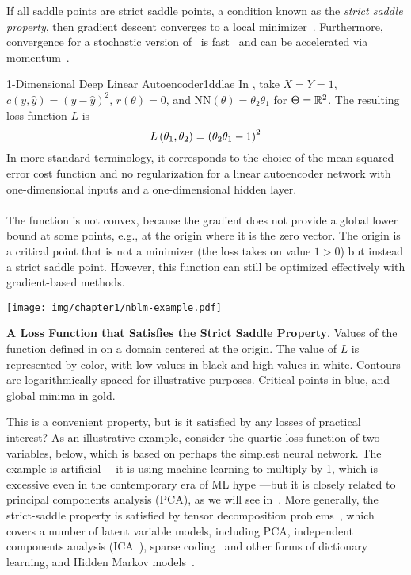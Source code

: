 \documentclass[../../thesis.tex]{subfiles}
\begin{document}
If all saddle points are strict saddle points,
a condition known as the \emph{strict saddle property},
then gradient descent converges to a local minimizer~\cite{lee2016,lee2019}.
Furthermore, convergence for a stochastic
version of~ is fast~\cite{jin2018a}
and can be accelerated via momentum~\cite{jin2018b}.

\begin{example}[float=hp]{1-Dimensional Deep Linear Autoencoder}{1ddlae}
	In , take $X = Y = 1$,
	$c(y, \hat{y}) = {\left(y - \hat{y}\right)}^2$,
	$r(\theta) = 0$,
	and
	$\mathrm{NN}(\theta) = \theta_2\theta_1$
	for $\Theta = \mathbb{R}^2$.
	The resulting loss function $L$ is
	\begin{equation}\equationlabel{nblm-example}
		L\left(\theta_1, \theta_2\right) = {\left(\theta_2\theta_1 - 1\right)}^2
	\end{equation}
	In more standard terminology,
	it corresponds to the choice of
	the mean squared error cost function
	and no regularization
	for a linear autoencoder network
	with one-dimensional inputs
	and a one-dimensional hidden layer.
	\\ \ \\
	The function is not convex,
	because the gradient
	does not provide a global lower bound
	at some points, e.g., at the origin
	where it is the zero vector.
	The origin is a critical point
	that is not a minimizer
	(the loss takes on value $1 > 0$)
	but instead a strict saddle point.
	However, this function can still be optimized effectively with
	gradient-based methods.

	\begin{center}
		\texttt{[image: img/chapter1/nblm-example.pdf]}
	\end{center}
	{\textbf{A Loss Function that Satisfies the Strict Saddle Property}.}%
	{Values of the function defined in 
	 on a domain centered at the origin.
	 The value of $L$ is represented by color,
	 with low values in black and high values in white.
	 Contours are logarithmically-spaced for illustrative purposes.
	 Critical points in blue, and global minima in gold.}
\end{example}

This is a convenient property, but is it satisfied
by any losses of practical interest?
As an illustrative example, consider the quartic loss function
of two variables,  below,
which is based on perhaps the simplest neural network.
The example is artificial---
it is using machine learning to multiply by 1,
which is excessive even in the contemporary era of ML hype
---but it is closely related to principal components analysis (PCA),
as we will see in~.
More generally, the strict-saddle property is
satisfied by tensor decomposition problems~\cite{ge2015},
which covers a number of latent variable models, including
PCA,
independent components analysis (ICA~\cite{bell1997,comon2009}),
sparse coding~\cite{olshausen1996}
and other forms of dictionary learning,
and Hidden Markov models~\cite{anandkumar2012}.
\end{document}
